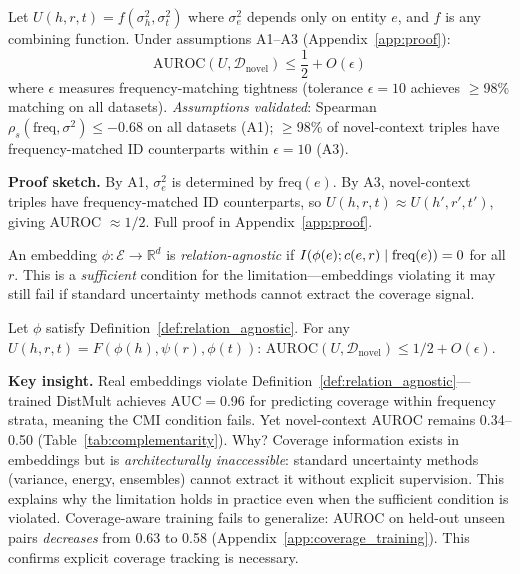 \begin{theorem}
\label{thm:impossibility}
Let $U(h,r,t) = f(\sigma^2_h, \sigma^2_t)$ where $\sigma^2_e$ depends only on entity $e$, and $f$ is any combining function. Under assumptions A1--A3 (Appendix~\ref{app:proof}):
\begin{equation}
    \text{AUROC}(U, \mathcal{D}_{\text{novel}}) \leq \frac{1}{2} + O(\epsilon)
\end{equation}
where $\epsilon$ measures frequency-matching tightness (tolerance $\epsilon{=}10$ achieves $\geq$98\% matching on all datasets). \emph{Assumptions validated}: Spearman $\rho_s(\text{freq}, \sigma^2) \leq {-}0.68$ on all datasets (A1); $\geq$98\% of novel-context triples have frequency-matched ID counterparts within $\epsilon{=}10$ (A3).
\end{theorem}

\textbf{Proof sketch.} By A1, $\sigma^2_e$ is determined by $\text{freq}(e)$. By A3, novel-context triples have frequency-matched ID counterparts, so $U(h,r,t) \approx U(h',r',t')$, giving AUROC $\approx 1/2$. Full proof in Appendix~\ref{app:proof}.

\begin{definition}
\label{def:relation_agnostic}
An embedding $\phi: \mathcal{E} \to \mathbb{R}^d$ is \emph{relation-agnostic} if $I(\phi(e); c(e,r) \mid \text{freq}(e)) = 0$ for all $r$. This is a \emph{sufficient} condition for the limitation---embeddings violating it may still fail if standard uncertainty methods cannot extract the coverage signal.
\end{definition}

\begin{theorem}
\label{thm:embedding_impossibility}
Let $\phi$ satisfy Definition~\ref{def:relation_agnostic}. For any $U(h,r,t) = F(\phi(h), \psi(r), \phi(t))$: $\text{AUROC}(U, \mathcal{D}_{\text{novel}}) \leq 1/2 + O(\epsilon)$.
\end{theorem}

\textbf{Key insight.} Real embeddings violate Definition~\ref{def:relation_agnostic}---trained DistMult achieves AUC$=$0.96 for predicting coverage within frequency strata, meaning the CMI condition fails. Yet novel-context AUROC remains 0.34--0.50 (Table~\ref{tab:complementarity}). Why? Coverage information exists in embeddings but is \emph{architecturally inaccessible}: standard uncertainty methods (variance, energy, ensembles) cannot extract it without explicit supervision. This explains why the limitation holds in practice even when the sufficient condition is violated. Coverage-aware training fails to generalize: AUROC on held-out unseen pairs \emph{decreases} from 0.63 to 0.58 (Appendix~\ref{app:coverage_training}). This confirms explicit coverage tracking is necessary.

